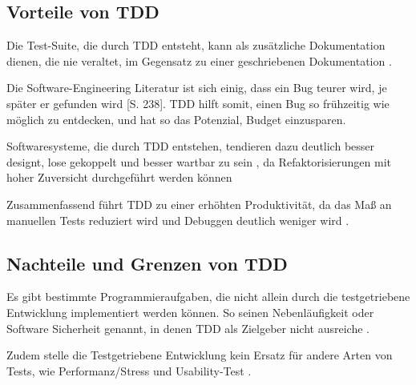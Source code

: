
  
  \subsection{Vorteile von TDD}
   
  Die Test-Suite, die durch TDD entsteht, kann als zusätzliche Dokumentation dienen, die nie veraltet, im Gegensatz zu einer geschriebenen Dokumentation \citep{palermo_guidelines_2006}.
  
  Die Software-Engineering Literatur ist sich einig, dass ein Bug teurer wird, je später er gefunden wird \citep{hunt_pragmatic_1999}[S. 238]. TDD hilft somit, einen Bug so frühzeitig wie möglich zu entdecken, und hat so das Potenzial, Budget einzusparen.
  
  Softwaresysteme, die durch TDD entstehen, tendieren dazu deutlich besser designt, lose gekoppelt und besser wartbar zu sein \citep{beck_test_2002} \citep{palermo_guidelines_2006}, da Refaktorisierungen mit hoher Zuversicht durchgeführt werden können
  
  Zusammenfassend führt TDD zu einer erhöhten Produktivität, da das Maß an manuellen Tests reduziert wird und Debuggen deutlich weniger wird \citep{palermo_guidelines_2006}.
  
  \subsection{Nachteile und Grenzen von TDD}
  Es gibt bestimmte Programmieraufgaben, die nicht allein durch die testgetriebene Entwicklung implementiert werden können. So seinen Nebenläufigkeit oder Software Sicherheit genannt, in denen TDD als Zielgeber nicht ausreiche \citep[S. xii]{beck_test_2002}.
  
  Zudem stelle die Testgetriebene Entwicklung kein Ersatz für andere Arten von Tests, wie Performanz/Stress und Usability-Test \citep[S. 86]{beck_test_2002}.
    
